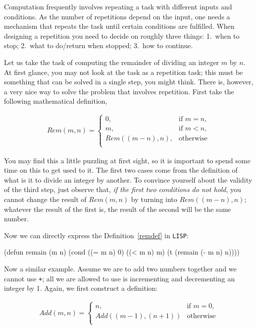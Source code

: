 \documentclass[a4paper,11pt]{article}
\begin{document}
\begin{uenum}
\item Computation frequently involves repeating a task with different inputs and conditions. As the number of repetitions depend on the input, one needs a mechanism that repeats the task until certain conditions are fulfilled. When designing a repetition you need to decide on roughly three things: 1.\ when to stop; 2.\ what to do/return when stopped; 3.\ how to continue.

Let us take the task of computing the remainder of dividing an integer $m$ by $n$. At first glance, you may not look at the task as a repetition task; this must be something that can be solved in a single step, you might think. There is, however, a very nice way to solve the problem that involves repetition. First take the following mathematical definition, 

\begin{align}\label{remdef}
Rem(m,n) =  
\begin{cases}
0, & \text{if } m = n, \\
m, &  \text{if } m < n, \\
Rem((m-n),n), & \text{otherwise}\\
\end{cases}
\end{align}

You may find this a little puzzling at first sight, so it is important to spend some time on this to get used to it. The first two cases come from the definition of what is it to divide an integer by another. To convince yourself about the validity of the third step, just observe that, \emph{if the first two conditions do not hold}, you cannot change the result of $Rem(m,n)$ by turning into $Rem((m - n),n)$; whatever the result of the first is, the result of the second will be the same number.

Now we can directly express the Definition~\ref{remdef} in \Verb+LISP+:

\begin{lispcode}
(defun remain (m n)
  (cond ((= m n) 0)
        ((< m n) m)
        (t (remain (- m n) n))))
\end{lispcode}

\item Now a similar example. Assume we are to add two numbers together and we cannot use \Verb=+=; all we are allowed to use is incrementing and decrementing an integer by 1. Again, we first construct a definition:

\begin{align}
Add(m,n) =  
\begin{cases}
n, & \text{if } m = 0, \\
Add((m - 1),(n + 1)) & \text{otherwise}\\
\end{cases}
\end{align}


\end{uenum}
\end{document}
